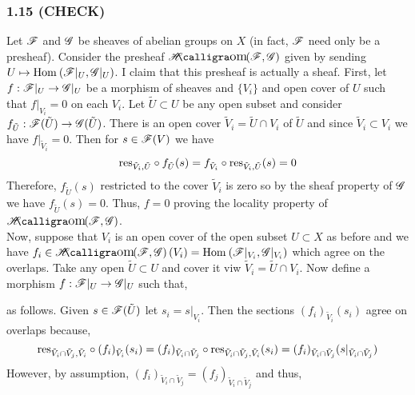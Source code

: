 \documentclass[12pt]{article}
\begin{document}
\subsubsection{1.15 (CHECK)}

Let $\mathscr{F}$ and $\mathscr{G}$ be sheaves of abelian groups on $X$ (in fact, $\mathscr{F}$ need only be a presheaf). Consider the presheaf $\shHom{}{\F}{\G}$ given by sending $U \mapsto \mathrm{Hom}_{} \left( \mathscr{F}|_U, \mathscr{G}|_U \right)$. I claim that this presheaf is actually a sheaf. First, let $f : \mathscr{F}|_U \to \mathscr{G}|_U$ be a morphism of sheaves and $\{ V_i \}$ and open cover of $U$ such that $f|_{V_i} = 0$ on each $V_i$. Let $\tilde{U} \subset U$ be any open subset and consider $f_{\tilde{U}} : \mathscr{F}(\tilde{U}) \to \mathscr{G}(\tilde{U})$. There is an open cover $\tilde{V}_i = \tilde{U} \cap V_i$ of $\tilde{U}$ and since $\tilde{V}_i \subset V_i$ we have $f|_{\tilde{V}_i} = 0$. Then for $s \in \mathscr{F}(V)$ we have \[ \mathrm{res}_{\tilde{V}_i, \tilde{U}} \circ f_{\tilde{U}}(s) = f_{\tilde{V}_i} \circ \mathrm{res}_{\tilde{V}_i, \tilde{U}}(s) = 0 \]
Therefore, $f_{\tilde{U}}(s)$ restricted to the cover $\tilde{V}_i$ is zero so by the sheaf property of $\mathscr{G}$ we have $f_{\tilde{U}}(s) = 0$. Thus, $f = 0$ proving the locality property of $\shHom{}{\F}{\G}$. 
\bigskip\\
Now, suppose that $V_i$ is an open cover of the open subset $U \subset X$ as before and we have $f_i \in \shHom{}{\F}{\G}(V_i) = \Hom{}{\F|_{V_i}}{\G|_{V_i}}$ which agree on the overlaps. Take any open $\tilde{U} \subset U$ and cover it viw $\tilde{V}_i = \tilde{U} \cap V_i$. Now define a morphism $f : \mathscr{F}|_U \to \mathscr{G}|_U$ such that,
\begin{center}
\end{center}
as follows. Given $s \in \mathscr{F}(\tilde{U})$ let $s_i = s |_{V_i}$. Then the sections $(f_i)_{\tilde{V}_i}(s_i)$ agree on overlaps because,
\[ \mathrm{res}_{\tilde{V}_i \cap \tilde{V}_j, \tilde{V}_i} \circ (f_i)_{\tilde{V}_i}(s_i) = (f_i)_{\tilde{V}_i \cap \tilde{V}_j} \circ \mathrm{res}_{\tilde{V}_i \cap \tilde{V}_j, \tilde{V}_i}(s_i) = (f_i)_{\tilde{V}_i \cap \tilde{V}_j}(s |_{\tilde{V}_i \cap \tilde{V}_j}) \]
However, by assumption, $(f_i)_{\tilde{V}_i \cap \tilde{V}_j} = (f_j)_{\tilde{V}_i \cap \tilde{V}_j}$ and thus,
\end{document}
